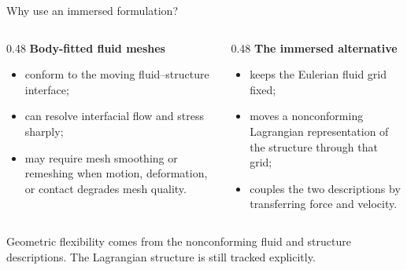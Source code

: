 \documentclass[aspectratio=169,11pt]{beamer}
\begin{document}
\begin{frame}{Why use an immersed formulation?}
\begin{columns}[T,onlytextwidth]
\begin{column}{0.48\textwidth}
\textbf{Body-fitted fluid meshes}
\begin{itemize}\itemsep5pt
  \item conform to the moving fluid--structure interface;
  \item can resolve interfacial flow and stress sharply;
  \item may require mesh smoothing or remeshing when motion, deformation, or contact degrades mesh quality.
\end{itemize}
\end{column}
\begin{column}{0.48\textwidth}
\textbf{The immersed alternative}
\begin{itemize}\itemsep5pt
  \item keeps the Eulerian fluid grid fixed;
  \item moves a nonconforming Lagrangian representation of the structure through that grid;
  \item couples the two descriptions by transferring force and velocity.
\end{itemize}
\end{column}
\end{columns}
\medskip
\begin{punchbox}
\small Geometric flexibility comes from the nonconforming fluid and structure descriptions. The Lagrangian structure is still tracked explicitly.
\end{punchbox}
\end{frame}
\end{document}
